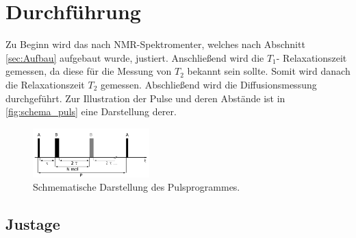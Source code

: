 \section{Durchführung}
\label{sec:durchführung}

    \noindent Zu Beginn wird das nach NMR-Spektromenter, welches nach Abschnitt \ref{sec:Aufbau} aufgebaut wurde, justiert. Anschließend wird die $T_1$- Relaxationszeit gemessen, da diese für die Messung von $T_2$ bekannt 
    sein sollte. Somit wird danach die Relaxationszeit $T_2$ gemessen.  Abschließend wird die Diffusionsmessung durchgeführt. Zur Illustration der Pulse und deren Abstände ist in \autoref{fig:schema_puls} eine Darstellung
    derer. 

    \begin{figure}[H]
        \centering
        \includegraphics[width=0.4\textwidth]{latex/images/schema_puls.png}
        \caption{Schmematische Darstellung des Pulsprogrammes. \cite{V49}}
        \label{fig:schema_puls}
    \end{figure}

    \subsection{Justage}

